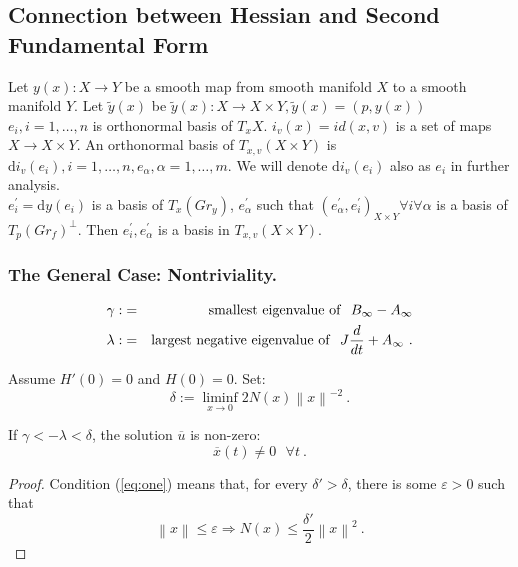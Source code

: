 \documentclass{llncs}
\newcommand{\Diff}{\mathrm{d}}
\begin{document}
\subsection{Connection between Hessian and Second Fundamental Form}
Let $y(x):X\to Y$ be a smooth map from smooth manifold $X$ to a smooth manifold $Y$. Let $\tilde{y}(x)$ be $\tilde{y}(x):X \to X\times Y, \tilde{y}(x)=(p,y(x))$
\\
${e_i, i=1, …,n}$ is orthonormal basis of $T_x X$.
$i_v(x)=id(x,v)$ is a set of maps $X\to X\times Y$. An orthonormal basis of $T_{x,v}(X\times Y)$ is ${\Diff i_v(e_i), i=1,\dots,n, e_\alpha,\alpha=1,\dots,m}$. We will denote $\Diff i_v(e_i)$ also as $e_i$ in further analysis. 
\\
$e_i^{'}=\Diff y(e_i)$ is a basis of $T_x (Gr_y)$, 
$e_\alpha^{'}$ such that $(e_\alpha^{'},e_i^{'})_{X\times Y} \forall i \forall \alpha$ is a basis of $T_p (Gr_f)^{\bot}$. Then $e_i^{'}, e_\alpha^{'}$ is a basis in $T_{x,v}(X\times Y)$.
\begin{corollary}

\end{corollary}
%
\subsubsection{The General Case: Nontriviality.} %
\begin{eqnarray}
\gamma :&=&{\rm smallest\ eigenvalue\ of}\ \ B_{\infty} - A_{\infty} \\
   \lambda : &=& {\rm largest\ negative\ eigenvalue\ of}\ \
   J \frac{d}{dt} +A_{\infty}\ .
\end{eqnarray}

\begin{proposition}
Assume $H'(0)=0$ and $ H(0)=0$. Set:
\begin{equation}
   \delta := \liminf_{x\to 0} 2 N (x) \left\|x\right\|^{-2}\ .
   \label{eq:one}
\end{equation}

If $\gamma < - \lambda < \delta$,
the solution $\overline{u}$ is non-zero:
\begin{equation}
   \overline{x} (t) \ne 0\ \ \ \forall t\ .
\end{equation}
\end{proposition}
%
\begin{proof}
Condition (\ref{eq:one}) means that, for every $\delta ' > \delta$, there is some $\varepsilon > 0$ such that \begin{equation}
   \left\|x\right\| \le \varepsilon \Rightarrow N (x) \le
   \frac{\delta '}{2} \left\|x\right\|^{2}\ .
\end{equation}
\end{proof}
\end{document}
